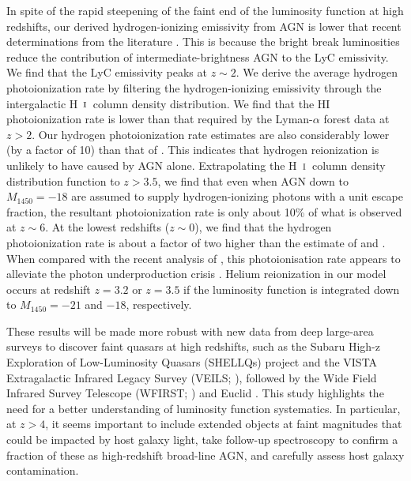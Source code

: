 \documentclass[fleqn,usenatbib]{mnras}
\def\HI{\hbox{H~$\scriptstyle\rm I$}}
\begin{document}
      In spite of the rapid steepening of the faint end of the luminosity
      function at high redshifts, our derived hydrogen-ionizing emissivity
      from AGN is lower that recent determinations from the literature
      \citep{2015AA...578A..83G}.  This is because the bright break
      luminosities reduce the contribution of intermediate-brightness AGN to
      the LyC emissivity.  We find that the LyC emissivity peaks at $z\sim
      2$.  We derive the average hydrogen photoionization rate by filtering
      the hydrogen-ionizing emissivity through the intergalactic \HI\ column
      density distribution.  We find that the HI photoionization rate is
      lower than that required by the Lyman-$\alpha$ forest data at $z>2$.
      Our hydrogen photoionization rate estimates are also considerably
      lower (by a factor of 10) than that of \citet{2015AA...578A..83G}.
      This indicates that hydrogen reionization is unlikely to have caused
      by AGN alone.  Extrapolating the \HI\ column density distribution
      function to $z>3.5$, we find that even when AGN down to $M_{1450}=-18$
      are assumed to supply hydrogen-ionizing photons with a unit escape
      fraction, the resultant photoionization rate is only about 10\% of
      what is observed at $z\sim 6$.  At the lowest redshifts ($z\sim 0$),
      we find that the hydrogen photoionization rate is about a factor of
      two higher than the estimate of \citet{2007ApJ...654..731H} and
      \citet{2012ApJ...746..125H}.  When compared with the recent analysis
      of \citet{2017MNRAS.467.3172G}, this photoionisation rate appears to
      alleviate the photon underproduction crisis
      \citep{2014ApJ...789L..32K}.  Helium reionization in our model occurs
      at redshift $z=3.2$ or $z=3.5$ if the luminosity function is
      integrated down to $M_{1450}=-21$ and $-18$, respectively.

      These results will be made more robust with new data from deep
      large-area surveys to discover faint quasars at high redshifts, such
      as the Subaru High-z Exploration of Low-Luminosity Quasars (SHELLQs)
      project \citep{2016ApJ...828...26M} and the VISTA Extragalactic
      Infrared Legacy Survey (VEILS; \citealt{2017MNRAS.464.1693H}),
      followed by the Wide Field Infrared Survey Telescope (WFIRST;
      \citealt{2013arXiv1305.5422S}) and Euclid \citep{2011arXiv1110.3193L}.
      This study highlights the need for a better understanding of
      luminosity function systematics.  In particular, at $z>4$, it seems
      important to include extended objects at faint magnitudes that could
      be impacted by host galaxy light, take follow-up spectroscopy to
      confirm a fraction of these as high-redshift broad-line AGN, and
      carefully assess host galaxy contamination.
\end{document}
